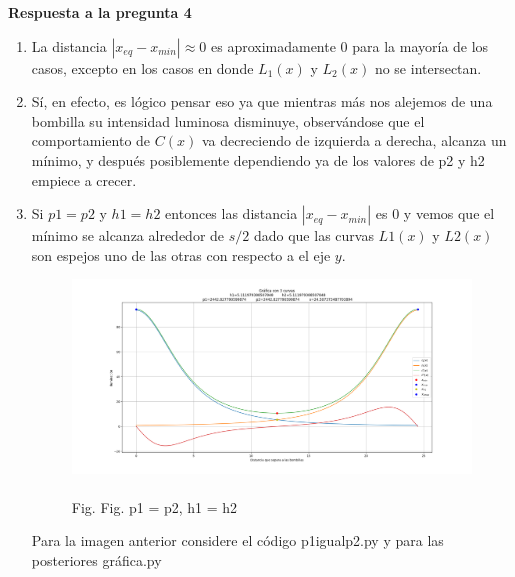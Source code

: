 \documentclass[11pt]{article}
\begin{document}
\noindent \textbf{Respuesta a la pregunta 4}
\begin{enumerate}
    \item La distancia  $|x_{eq} - x_{min}| \approx 0$ es aproximadamente 0 para la mayoría de los casos, excepto en los casos en donde $L_1(x)$ y $L_2(x)$ no se intersectan.


    \item Sí, en efecto, es lógico pensar eso ya que mientras más nos alejemos de una bombilla su intensidad luminosa disminuye, observándose que el comportamiento de $C(x)$ va decreciendo de izquierda a derecha, alcanza un mínimo, y después posiblemente dependiendo ya de los valores de p2 y h2 empiece a crecer. 
    
    \item Si $p1=p2$ y $h1=h2$ entonces las distancia $|x_{eq} - x_{min}|$ es 0 y vemos que el mínimo se alcanza alrededor de $s/2$ dado que las curvas $L1(x)$ y $L2(x)$ son espejos uno de las otras con respecto a el eje $y$.
    
    \begin{figure}[!h]
	    \includegraphics[keepaspectratio, width=15cm]{Imagenes/p1igualp2.png}
	    \caption{\\Fig. Fig. p1 = p2, h1 = h2 \label{fig:grafica2}}
	\end{figure}
    Para la imagen anterior considere el código p1igualp2.py y para las posteriores gráfica.py
    

\end{enumerate}
\end{document}
